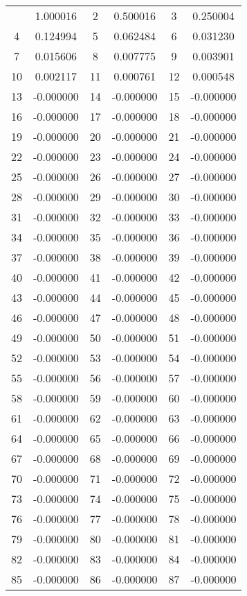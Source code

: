 \documentclass[12pt]{article}
\begin{document}
\begin{longtable}{@{}cc|cc|cc@{}}
\bottomrule
\endlastfoot
1 & 1.000016 & 2 & 0.500016 & 3 & 0.250004 \\
4 & 0.124994 & 5 & 0.062484 & 6 & 0.031230 \\
7 & 0.015606 & 8 & 0.007775 & 9 & 0.003901 \\
10 & 0.002117 & 11 & 0.000761 & 12 & 0.000548 \\
13 & -0.000000 & 14 & -0.000000 & 15 & -0.000000 \\
16 & -0.000000 & 17 & -0.000000 & 18 & -0.000000 \\
19 & -0.000000 & 20 & -0.000000 & 21 & -0.000000 \\
22 & -0.000000 & 23 & -0.000000 & 24 & -0.000000 \\
25 & -0.000000 & 26 & -0.000000 & 27 & -0.000000 \\
28 & -0.000000 & 29 & -0.000000 & 30 & -0.000000 \\
31 & -0.000000 & 32 & -0.000000 & 33 & -0.000000 \\
34 & -0.000000 & 35 & -0.000000 & 36 & -0.000000 \\
37 & -0.000000 & 38 & -0.000000 & 39 & -0.000000 \\
40 & -0.000000 & 41 & -0.000000 & 42 & -0.000000 \\
43 & -0.000000 & 44 & -0.000000 & 45 & -0.000000 \\
46 & -0.000000 & 47 & -0.000000 & 48 & -0.000000 \\
49 & -0.000000 & 50 & -0.000000 & 51 & -0.000000 \\
52 & -0.000000 & 53 & -0.000000 & 54 & -0.000000 \\
55 & -0.000000 & 56 & -0.000000 & 57 & -0.000000 \\
58 & -0.000000 & 59 & -0.000000 & 60 & -0.000000 \\
61 & -0.000000 & 62 & -0.000000 & 63 & -0.000000 \\
64 & -0.000000 & 65 & -0.000000 & 66 & -0.000000 \\
67 & -0.000000 & 68 & -0.000000 & 69 & -0.000000 \\
70 & -0.000000 & 71 & -0.000000 & 72 & -0.000000 \\
73 & -0.000000 & 74 & -0.000000 & 75 & -0.000000 \\
76 & -0.000000 & 77 & -0.000000 & 78 & -0.000000 \\
79 & -0.000000 & 80 & -0.000000 & 81 & -0.000000 \\
82 & -0.000000 & 83 & -0.000000 & 84 & -0.000000 \\
85 & -0.000000 & 86 & -0.000000 & 87 & -0.000000 \\

\end{longtable}
\end{document}
